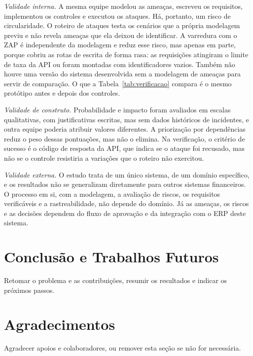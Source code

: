 \documentclass[conference]{IEEEtran}
\begin{document}
\emph{Validade interna.} A mesma equipe modelou as ameaças, escreveu os requisitos, implementou os controles e executou os ataques. Há, portanto, um risco de circularidade. O roteiro de ataques testa os cenários que a própria modelagem previu e não revela ameaças que ela deixou de identificar. A varredura com o ZAP é independente da modelagem e reduz esse risco, mas apenas em parte, porque cobriu as rotas de escrita de forma rasa: as requisições atingiram o limite de taxa da API ou foram montadas com identificadores vazios. Também não houve uma versão do sistema desenvolvida sem a modelagem de ameaças para servir de comparação. O que a Tabela~\ref{tab:verificacao} compara é o mesmo protótipo antes e depois dos controles.

\emph{Validade de construto.} Probabilidade e impacto foram avaliados em escalas qualitativas, com justificativas escritas, mas sem dados históricos de incidentes, e outra equipe poderia atribuir valores diferentes. A priorização por dependências reduz o peso dessas pontuações, mas não o elimina. Na verificação, o critério de sucesso é o código de resposta da API, que indica se o ataque foi recusado, mas não se o controle resistiria a variações que o roteiro não exercitou.

\emph{Validade externa.} O estudo trata de um único sistema, de um domínio específico, e os resultados não se generalizam diretamente para outros sistemas financeiros. O processo em si, com a modelagem, a avaliação de riscos, os requisitos verificáveis e a rastreabilidade, não depende do domínio. Já as ameaças, os riscos e as decisões dependem do fluxo de aprovação e da integração com o ERP deste sistema.


\section{Conclusão e Trabalhos Futuros}
\label{sec:conclusao}
Retomar o problema e as contribuições, resumir os resultados e indicar os próximos passos.

\section*{Agradecimentos}
Agradecer apoios e colaboradores, ou remover esta seção se não for necessária.



\end{document}
